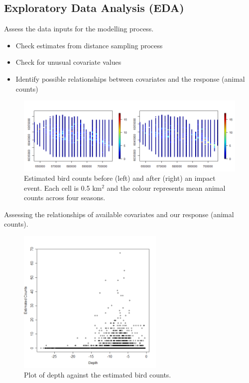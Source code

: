 \subsection{Exploratory Data Analysis (EDA)}
\begin{frame}[fragile]
Assess the data inputs for the modelling process.
\begin{itemize}
\item Check estimates from distance sampling process
\item Check for unusual covariate values
\item Identify possible relationships between covariates and the response (animal counts)
\end{itemize}

\begin{figure}[h]
\centering
  \includegraphics[width=12cm]{danish/nhats.png}
\caption{Estimated bird counts before (left) and after (right) an impact event.  Each cell is 0.5 km$^2$ and the colour represents mean animal counts across four seasons.}
\label{fig:rawnhats}
\end{figure}
\end{frame}


\begin{frame}
Assessing the relationships of available covariates and our response (animal counts).
\end{frame}

\begin{frame}
\begin{figure}[h!]
  \centering
  \includegraphics[width=7cm]{danish/depth.png}
\caption{Plot of depth against the estimated bird counts.}
\label{fig:exploratory1}
\end{figure}
\end{frame}

